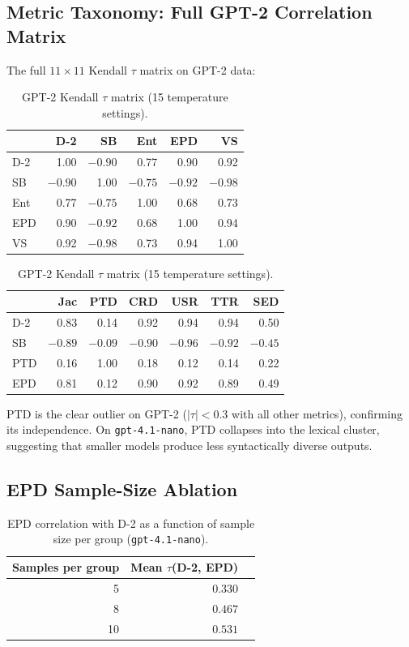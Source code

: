 \documentclass[11pt]{article}
\begin{document}
\subsection{Metric Taxonomy: Full GPT-2 Correlation Matrix}

The full $11 \times 11$ Kendall $\tau$ matrix on GPT-2 data:

{\small
\begin{table}[H]
\centering
\caption{GPT-2 Kendall $\tau$ matrix (15 temperature settings).}
\begin{tabular}{l|rrrrr}
\toprule
 & D-2 & SB & Ent & EPD & VS \\
\midrule
D-2  & 1.00 & $-0.90$ & 0.77 & 0.90 & 0.92 \\
SB   & $-0.90$ & 1.00 & $-0.75$ & $-0.92$ & $-0.98$ \\
Ent  & 0.77 & $-0.75$ & 1.00 & 0.68 & 0.73 \\
EPD  & 0.90 & $-0.92$ & 0.68 & 1.00 & 0.94 \\
VS   & 0.92 & $-0.98$ & 0.73 & 0.94 & 1.00 \\
\bottomrule
\end{tabular}

\medskip

\begin{tabular}{l|rrrrrr}
\toprule
 & Jac & PTD & CRD & USR & TTR & SED \\
\midrule
D-2  & 0.83 & 0.14 & 0.92 & 0.94 & 0.94 & 0.50 \\
SB   & $-0.89$ & $-0.09$ & $-0.90$ & $-0.96$ & $-0.92$ & $-0.45$ \\
PTD  & 0.16 & 1.00 & 0.18 & 0.12 & 0.14 & 0.22 \\
EPD  & 0.81 & 0.12 & 0.90 & 0.92 & 0.89 & 0.49 \\
\bottomrule
\end{tabular}
\end{table}
}

PTD is the clear outlier on GPT-2 ($|\tau| < 0.3$ with all other metrics),
confirming its independence. On \texttt{gpt-4.1-nano}, PTD collapses
into the lexical cluster, suggesting that smaller models produce
less syntactically diverse outputs.

\subsection{EPD Sample-Size Ablation}

\begin{table}[H]
\centering
\caption{EPD correlation with D-2 as a function of sample size
per group (\texttt{gpt-4.1-nano}).}
\begin{tabular}{rrr}
\toprule
Samples per group & Mean $\tau$(D-2, EPD) \\
\midrule
5  & $0.330$ \\
8  & $0.467$ \\
10 & $0.531$ \\
\bottomrule
\end{tabular}
\end{table}
\end{document}
